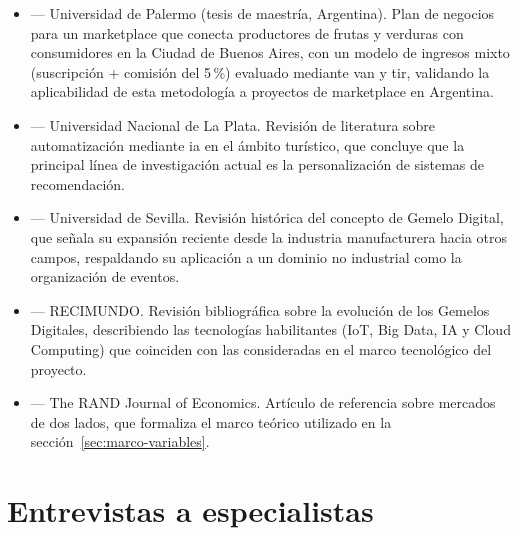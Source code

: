 \begin{itemize}
    \item \citet{licht2023} --- Universidad de Palermo (tesis de
          maestría, Argentina). Plan de negocios para un marketplace que
          conecta productores de frutas y verduras con consumidores en la
          Ciudad de Buenos Aires, con un modelo de ingresos mixto
          (suscripción + comisión del 5\,\%) evaluado mediante \gls{van}
          y \gls{tir}, validando la aplicabilidad de esta metodología a
          proyectos de marketplace en Argentina.
    \item \citet{riveroetal2025} --- Universidad Nacional de La Plata.
          Revisión de literatura sobre automatización mediante \gls{ia}
          en el ámbito turístico, que concluye que la principal línea de
          investigación actual es la personalización de sistemas de
          recomendación.
    \item \citet{chicaizaetal2024} --- Universidad de Sevilla. Revisión
          histórica del concepto de Gemelo Digital, que señala su
          expansión reciente desde la industria manufacturera hacia otros
          campos, respaldando su aplicación a un dominio no industrial
          como la organización de eventos.
    \item \citet{varaschiquito2020} --- RECIMUNDO. Revisión bibliográfica
          sobre la evolución de los Gemelos Digitales, describiendo las
          tecnologías habilitantes (IoT, Big Data, IA y Cloud Computing)
          que coinciden con las consideradas en el marco tecnológico del
          proyecto.
    \item \citet{rochettirole2006} --- The RAND Journal of Economics.
          Artículo de referencia sobre mercados de dos lados, que
          formaliza el marco teórico utilizado en la
          sección~\ref{sec:marco-variables}.
\end{itemize}

\section{Entrevistas a especialistas}

